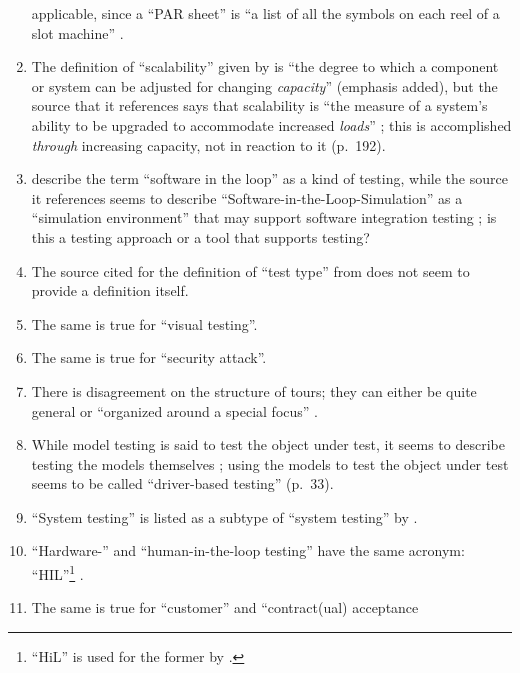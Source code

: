 \begin{enumerate}
            applicable, since a ``PAR sheet'' is ``a list of all the symbols
            on each reel of a slot machine'' \citep{Bluejay2024}.
      \item The definition of ``scalability'' given by \citetISTQB{} is
            ``the degree to which a component or system can be adjusted for
            changing \emph{capacity}'' (emphasis added), but the source that it
            references says that scalability is ``the measure of a system's
            ability to be upgraded to accommodate increased \emph{loads}''
            \citep[p.~381,~emphasis added]{GerrardAndThompson2002}; this is
            accomplished \emph{through} increasing capacity, not in reaction to
            it (p.~192).
      \item \citetISTQB{} describe the term ``software in the loop'' as a
            kind of testing, while the source it references seems to describe
            ``Software-in-the-Loop-Simulation'' as a ``simulation environment''
            that may support software integration testing
            \citep[p.~153]{SPICE2022}; is this a testing approach or a tool
            that supports testing?
      \item The source cited for the definition of ``test type'' from
            \citepISTQB{} does not seem to provide a definition itself.
      \item The same is true for ``visual testing''.
      \item The same is true for ``security attack''.
      \item There is disagreement on the structure of tours; they can either be
            quite general \citep[p.~34]{IEEE2022} or ``organized around a
            special focus'' \citepISTQB{}.
      \item While model testing is said to test the object under test,
            it seems to describe testing the models themselves
            \citet[p.~20]{Firesmith2015}; using the models to test the object
            under test seems to be called ``driver-based testing'' (p.~33).
      \item ``System testing'' is listed as a subtype of ``system testing'' by
            \citet[p.~23]{Firesmith2015}.
      \item ``Hardware-'' and ``human-in-the-loop testing'' have the same
            acronym: ``HIL''\footnote{``HiL'' is used for the former by
                  \citet[p.~2]{PreußeEtAl2012}.} \citep[p.~23]{Firesmith2015}.
      \item The same is true for ``customer'' and ``contract(ual) acceptance

\end{enumerate}
